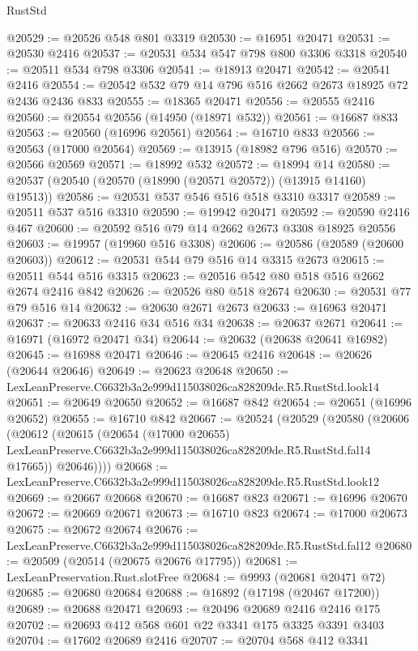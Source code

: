 \begin{lexlean}{RustStd}
\begin{coremodule}
@20529 := @20526 @548 @801 @3319
@20530 := @16951 @20471
@20531 := @20530 @2416
@20537 := @20531 @534 @547 @798 @800 @3306 @3318
@20540 := @20511 @534 @798 @3306
@20541 := @18913 @20471
@20542 := @20541 @2416
@20554 := @20542 @532 @79 @14 @796 @516 @2662 @2673 @18925 @72 @2436 @2436 @833
@20555 := @18365 @20471
@20556 := @20555 @2416
@20560 := @20554 @20556 (@14950 (@18971 @532))
@20561 := @16687 @833
@20563 := @20560 (@16996 @20561)
@20564 := @16710 @833
@20566 := @20563 (@17000 @20564)
@20569 := @13915 (@18982 @796 @516)
@20570 := @20566 @20569
@20571 := @18992 @532
@20572 := @18994 @14
@20580 := @20537 (@20540 (@20570 (@18990 (@20571 @20572)) (@13915 @14160) @19513))
@20586 := @20531 @537 @546 @516 @518 @3310 @3317
@20589 := @20511 @537 @516 @3310
@20590 := @19942 @20471
@20592 := @20590 @2416 @467
@20600 := @20592 @516 @79 @14 @2662 @2673 @3308 @18925 @20556
@20603 := @19957 (@19960 @516 @3308)
@20606 := @20586 (@20589 (@20600 @20603))
@20612 := @20531 @544 @79 @516 @14 @3315 @2673
@20615 := @20511 @544 @516 @3315
@20623 := @20516 @542 @80 @518 @516 @2662 @2674 @2416 @842
@20626 := @20526 @80 @518 @2674
@20630 := @20531 @77 @79 @516 @14
@20632 := @20630 @2671 @2673
@20633 := @16963 @20471
@20637 := @20633 @2416 @34 @516 @34
@20638 := @20637 @2671
@20641 := @16971 (@16972 @20471 @34)
@20644 := @20632 (@20638 @20641 @16982)
@20645 := @16988 @20471
@20646 := @20645 @2416
@20648 := @20626 (@20644 @20646)
@20649 := @20623 @20648
@20650 := LexLeanPreserve.C6632b3a2e999d115038026ca828209de.R5.RustStd.look14
@20651 := @20649 @20650
@20652 := @16687 @842
@20654 := @20651 (@16996 @20652)
@20655 := @16710 @842
@20667 := @20524
    (@20529
      (@20580
        (@20606
          (@20612
            (@20615
              (@20654
                (@17000 @20655)
                LexLeanPreserve.C6632b3a2e999d115038026ca828209de.R5.RustStd.fal14
                @17665))
            @20646))))
@20668 := LexLeanPreserve.C6632b3a2e999d115038026ca828209de.R5.RustStd.look12
@20669 := @20667 @20668
@20670 := @16687 @823
@20671 := @16996 @20670
@20672 := @20669 @20671
@20673 := @16710 @823
@20674 := @17000 @20673
@20675 := @20672 @20674
@20676 := LexLeanPreserve.C6632b3a2e999d115038026ca828209de.R5.RustStd.fal12
@20680 := @20509 (@20514 (@20675 @20676 @17795))
@20681 := LexLeanPreservation.Rust.slotFree
@20684 := @9993 (@20681 @20471 @72)
@20685 := @20680 @20684
@20688 := @16892 (@17198 (@20467 @17200))
@20689 := @20688 @20471
@20693 := @20496 @20689 @2416 @2416 @175
@20702 := @20693 @412 @568 @601 @22 @3341 @175 @3325 @3391 @3403
@20704 := @17602 @20689 @2416
@20707 := @20704 @568 @412 @3341

\end{coremodule}
\end{lexlean}
